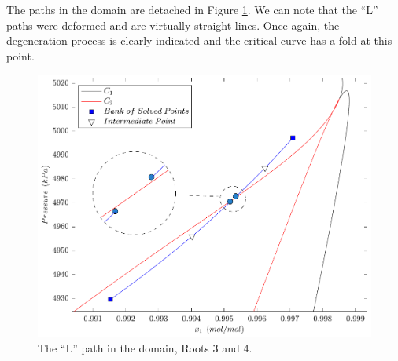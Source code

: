 \documentclass{article}
\theoremstyle{definition}
\theoremstyle{remark}
\begin{document}
The paths in the domain are detached in Figure \ref{fig:L_path_domain}. We can note that the ``L'' paths were deformed and are virtually straight lines. Once again, the degeneration process is clearly indicated and the critical curve has a fold at this point.

\begin{figure}
	\begin{center}
		\includegraphics[scale=0.50]{caminhos_L_degeneracao_dominio_new.pdf}
		\caption{The ``L'' path in the domain, Roots 3 and 4.}\label{fig:L_path_domain}
	\end{center}
\end{figure}
\end{document}
